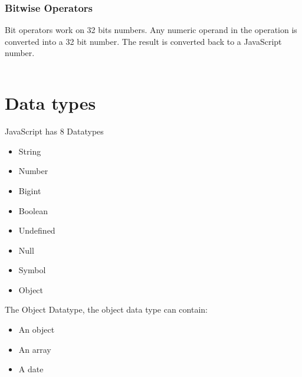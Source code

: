\subsubsection{Bitwise Operators}
Bit operators work on 32 bits numbers.
Any numeric operand in the operation is converted into a 32 bit number. The result is converted back to a JavaScript number.
\begin{flushleft}
    \begin{spacing}{1.7}
        \begin{tabular}{p{4cm} ll}
        \end{tabular}
    \end{spacing}
\end{flushleft}

\section{Data types}

JavaScript has 8 Datatypes

\begin{itemize}
    \item String
    \item Number
    \item Bigint
    \item Boolean
    \item Undefined
    \item Null
    \item Symbol
    \item Object
\end{itemize}

The Object Datatype, the object data type can contain: 

\begin{itemize}
    \item An object
    \item An array
    \item A date
\end{itemize}











